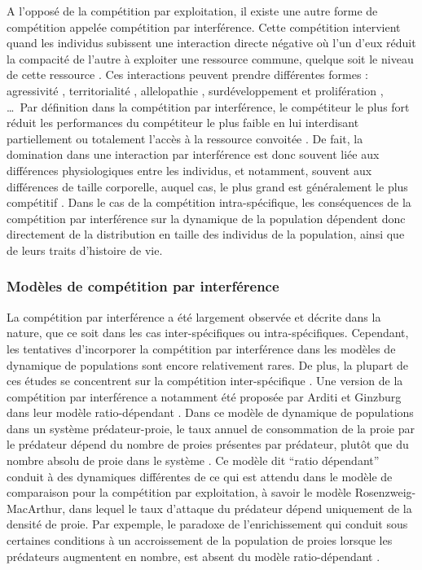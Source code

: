 A l'opposé de la compétition par exploitation, il existe une autre forme de
compétition appelée compétition par interférence. Cette compétition intervient
quand les individus subissent une interaction directe négative où l'un d'eux
réduit la compacité de l'autre à exploiter une ressource commune, quelque soit
le niveau de cette ressource \autocites{park1954a,vance1984a}. Ces interactions
peuvent prendre différentes formes : agressivité \autocites{schoener1976a},
territorialité \autocites{walls1990a,kennedy1996a}, allelopathie
\autocites{harper1977a,rice1984a,nilsson1994a}, surdéveloppement et prolifération
\autocites{connell1961a,paine1966a}, \ldots~Par définition dans la compétition
par interférence, le compétiteur le plus fort réduit les performances du
compétiteur le plus faible en lui interdisant
partiellement ou totalement l'accès à la ressource convoitée
\autocites{schoener1983a, thompson1993a}. De fait, la domination dans une
interaction par interférence est donc souvent liée aux différences
physiologiques entre les individus, et notamment, souvent aux différences de
taille corporelle, auquel cas, le plus grand est généralement le plus
compétitif \autocites{mccormick2012a}. Dans le cas de la compétition
intra-spécifique, les conséquences de la compétition par interférence sur la
dynamique de la population dépendent donc directement de la distribution en
taille des individus de la population, ainsi que de leurs traits d'histoire de
vie. 

\subsubsection{Modèles de compétition par interférence}

La compétition par interférence a été largement observée et décrite dans la
nature, que ce soit dans les cas inter-spécifiques ou intra-spécifiques.
Cependant, les tentatives d'incorporer la compétition par interférence dans les
modèles de dynamique de populations sont encore relativement rares. De plus, la
plupart de ces études se concentrent sur la compétition inter-spécifique
\autocites{case1974a, carothers1984a, vance1984a, adler2000a}. Une version de la
compétition par interférence a notamment été proposée par Arditi et Ginzburg
dans leur modèle ratio-dépendant \autocites{arditi1989a,arditi2012a,arditi1991a}.
Dans ce modèle de dynamique de populations dans un système prédateur-proie, le
taux annuel de consommation de la proie par le prédateur dépend du nombre de
proies présentes par prédateur, plutôt que du nombre absolu de proie dans le
système \autocite[voir][pour les détails et dérivations du modèle]{arditi2012a}.
Ce modèle dit ``ratio dépendant'' conduit à des dynamiques différentes de ce qui
est attendu dans le modèle de comparaison pour la compétition par exploitation,
à savoir le modèle Rosenzweig-MacArthur, dans lequel le taux d'attaque du
prédateur dépend uniquement de la densité de proie. Par expemple, le paradoxe de
l'enrichissement qui conduit sous certaines conditions à un accroissement de la
population de proies lorsque les prédateurs augmentent en nombre, est absent du
modèle ratio-dépendant \autocites{arditi2012a}. 

